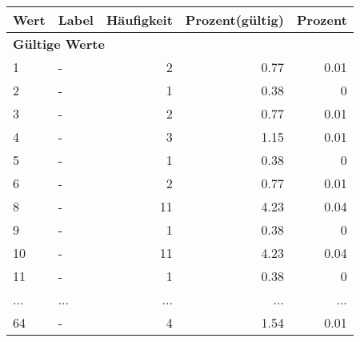      \begin{longtable}{lXrrr}
     \toprule
     \textbf{Wert} & \textbf{Label} & \textbf{Häufigkeit} & \textbf{Prozent(gültig)} & \textbf{Prozent} \\
     \endhead
     \midrule
     \multicolumn{5}{l}{\textbf{Gültige Werte}}\\
        1 & \multicolumn{1}{X}{-} & %
          \num{2} &
          \num[round-mode=places,round-precision=2]{0,77} &
          \num[round-mode=places,round-precision=2]{0,01} \\
        2 & \multicolumn{1}{X}{-} & %
          \num{1} &
          \num[round-mode=places,round-precision=2]{0,38} &
          \num[round-mode=places,round-precision=2]{0} \\
        3 & \multicolumn{1}{X}{-} & %
          \num{2} &
          \num[round-mode=places,round-precision=2]{0,77} &
          \num[round-mode=places,round-precision=2]{0,01} \\
        4 & \multicolumn{1}{X}{-} & %
          \num{3} &
          \num[round-mode=places,round-precision=2]{1,15} &
          \num[round-mode=places,round-precision=2]{0,01} \\
        5 & \multicolumn{1}{X}{-} & %
          \num{1} &
          \num[round-mode=places,round-precision=2]{0,38} &
          \num[round-mode=places,round-precision=2]{0} \\
        6 & \multicolumn{1}{X}{-} & %
          \num{2} &
          \num[round-mode=places,round-precision=2]{0,77} &
          \num[round-mode=places,round-precision=2]{0,01} \\
        8 & \multicolumn{1}{X}{-} & %
          \num{11} &
          \num[round-mode=places,round-precision=2]{4,23} &
          \num[round-mode=places,round-precision=2]{0,04} \\
        9 & \multicolumn{1}{X}{-} & %
          \num{1} &
          \num[round-mode=places,round-precision=2]{0,38} &
          \num[round-mode=places,round-precision=2]{0} \\
        10 & \multicolumn{1}{X}{-} & %
          \num{11} &
          \num[round-mode=places,round-precision=2]{4,23} &
          \num[round-mode=places,round-precision=2]{0,04} \\
        11 & \multicolumn{1}{X}{-} & %
          \num{1} &
          \num[round-mode=places,round-precision=2]{0,38} &
          \num[round-mode=places,round-precision=2]{0} \\
       ... & ... & ... & ... & ... \\
        64 & \multicolumn{1}{X}{-} & %
          \num{4} &
          \num[round-mode=places,round-precision=2]{1,54} &
          \num[round-mode=places,round-precision=2]{0,01} \\


\end{longtable}
